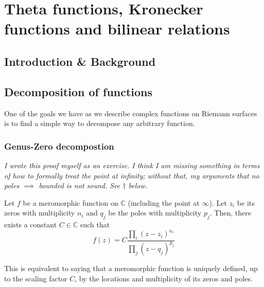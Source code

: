 


\chapter{Theta functions, Kronecker functions and bilinear relations}
\label{rep:B12}

\section{Introduction \& Background}




\cite{ZCC22}
\cite{Bertola2010RiemannSA}

\section{Decomposition of functions}

One of the goals we have as we describe complex functions on Riemann surfaces is to find a simple way to decompose any arbitrary function.

\subsection{Genus-Zero decompostion}


\emph{I wrote this proof myself as an exercise. I think I am missing something in terms of how to formally treat the point at infinity; without that, my arguments that no poles $\implies$ bounded is not sound. See $\dagger$ below.}

\begin{theorem}
    Let $f$ be a meromorphic function on $\mathbb{C}$ (including the point at $\infty$). Let $z_i$ be its zeros with multiplicity $n_i$ and $q_j$ be the poles with multiplicity $p_j$. Then, there exists a constant $C \in \mathbb{C}$ such that
    \begin{equation}
        f(z) = C\frac{\prod_i (z-z_i)^{n_i}}{\prod_j (z-q_j)^{p_j}} \label{eqnB12:gen0decomp}
    \end{equation}

    This is equivalent to saying that a meromorphic function is uniquely defined, up to the scaling factor $C$, by the locations and multiplicity of its zeros and poles. 
\end{theorem}

